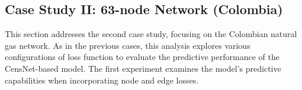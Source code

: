 %






\subsection{Case Study II: 63-node Network (Colombia)}


This section addresses the second case study, focusing on the Colombian natural gas network. As in the previous cases, this analysis explores various configurations of loss function to evaluate the predictive performance of the CensNet-based model. The first experiment examines the model's predictive capabilities when incorporating node and edge losses.

